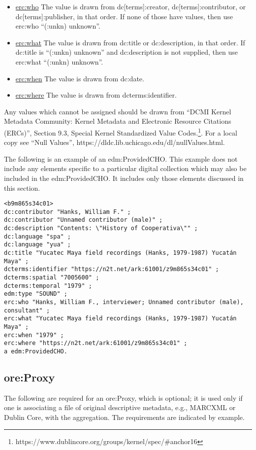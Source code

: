 \documentclass[11pt]{article}
\begin{document}
\begin{itemize}
\item \underline{erc:who} The value is drawn from dc[terms]:creator, dc[terms]:contributor, or dc[terms]:publisher, in that order. If none of those have values, then use erc:who ``(:unkn) unknown''.
\item \underline{erc:what} The value is drawn from dc:title or dc:description, in that order. If dc:title is ``(:unkn) unknown'' and dc:description is not supplied, then use erc:what ``(:unkn) unknown''.
\item \underline{erc:when} The value is drawn from dc:date.
\item \underline{erc:where} The value is drawn from dcterms:identifier.
\end{itemize}

Any values which cannot be assigned should be drawn from ``DCMI Kernel Metadata Community: Kernel Metadata and Electronic Resource Citations (ERCs)'', Section 9.3, Special Kernel Standardized Value Codes.\footnote{https://www.dublincore.org/groups/kernel/spec/\#anchor16}. For a local copy see ``Null Values'', https://dldc.lib.uchicago.edu/dl/nullValues.html.

The following is an example of an edm:ProvidedCHO. This example does not include any elements specific to a particular digital collection which may also be included in the edm:ProvidedCHO. It includes only those elements discussed in this section.

\begin{verbatim}
<b9m865s34c01>
dc:contributor "Hanks, William F." ;
dc:contributor "Unnamed contributor (male)" ;
dc:description "Contents: \"History of Cooperativa\"" ;
dc:language "spa" ;
dc:language "yua" ;
dc:title "Yucatec Maya field recordings (Hanks, 1979-1987) Yucatán Maya" ;
dcterms:identifier "https://n2t.net/ark:61001/z9m865s34c01" ;
dcterms:spatial "7005600" ;
dcterms:temporal "1979" ;
edm:type "SOUND" ;
erc:who "Hanks, William F., interviewer; Unnamed contributor (male), consultant" ;
erc:what "Yucatec Maya field recordings (Hanks, 1979-1987) Yucatán Maya" ;
erc:when "1979" ;
erc:where "https://n2t.net/ark:61001/z9m865s34c01" ;
a edm:ProvidedCHO.
\end{verbatim}

\subsection{ore:Proxy}

The following are required for an ore:Proxy, which is optional; it is used only if one is associating a file of original descriptive metadata, e.g., MARCXML or Dublin Core, with the aggregation. The requirements are indicated by example. 
\end{document}
